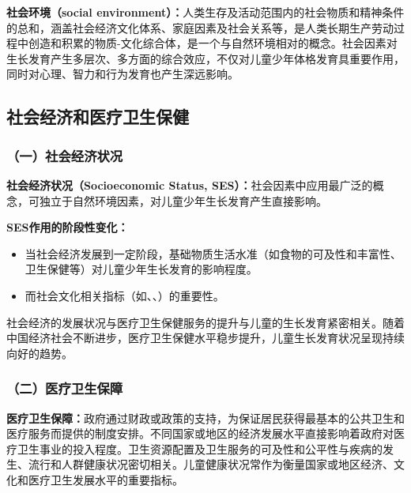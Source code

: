 \begin{defbox}
\textbf{社会环境（social environment）：}人类生存及活动范围内的社会物质和精神条件的总和，涵盖社会经济文化体系、家庭因素及社会关系等，是人类长期生产劳动过程中创造和积累的物质-文化综合体，是一个与自然环境相对的概念。社会因素对生长发育产生多层次、多方面的综合效应，不仅对儿童少年体格发育具重要作用，同时对心理、智力和行为发育也产生深远影响。
\end{defbox}

\subsection{社会经济和医疗卫生保健}

\subsubsection{（一）社会经济状况}

\begin{keybox}
\textbf{社会经济状况（Socioeconomic Status, SES）：}社会因素中应用最广泛的概念，可独立于自然环境因素，对儿童少年生长发育产生直接影响。

\textbf{SES作用的阶段性变化：}
\begin{itemize}[leftmargin=*]
    \item 当社会经济发展到一定阶段，基础物质生活水准（如食物的可及性和丰富性、卫生保健等）对儿童少年生长发育的影响程度。
    \item 而社会文化相关指标（如、、）的重要性。
\end{itemize}

社会经济的发展状况与医疗卫生保健服务的提升与儿童的生长发育紧密相关。随着中国经济社会不断进步，医疗卫生保健水平稳步提升，儿童生长发育状况呈现持续向好的趋势。
\end{keybox}

\subsubsection{（二）医疗卫生保障}

\begin{defbox}
\textbf{医疗卫生保障：}政府通过财政或政策的支持，为保证居民获得最基本的公共卫生和医疗服务而提供的制度安排。不同国家或地区的经济发展水平直接影响着政府对医疗卫生事业的投入程度。卫生资源配置及卫生服务的可及性和公平性与疾病的发生、流行和人群健康状况密切相关。儿童健康状况常作为衡量国家或地区经济、文化和医疗卫生发展水平的重要指标。
\end{defbox}

